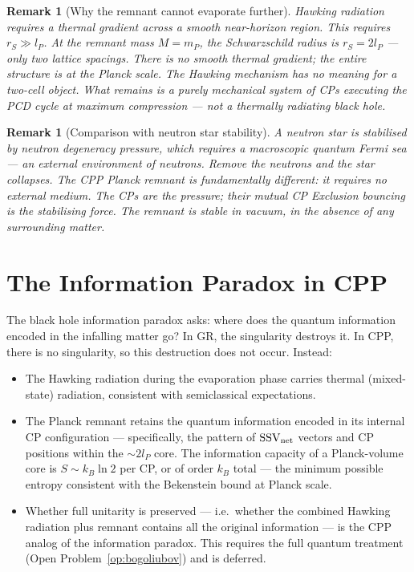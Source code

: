 \documentclass[12pt]{article}
\newtheorem{remark}[theorem]{Remark}
\newcommand{\lP}{l_P}
\newcommand{\mP}{m_P}
\newcommand{\rS}{r_S}
\newcommand{\SSV}{\mathrm{SSV}}
\begin{document}
\begin{remark}[Why the remnant cannot evaporate further]
Hawking radiation requires a thermal gradient across a smooth
near-horizon region.  This requires $\rS \gg \lP$.  At the remnant
mass $M = \mP$, the Schwarzschild radius is $\rS = 2\lP$ — only two
lattice spacings.  There is no smooth thermal gradient; the entire
structure is at the Planck scale.  The Hawking mechanism has no
meaning for a two-cell object.  What remains is a purely mechanical
system of CPs executing the PCD cycle at maximum compression —
not a thermally radiating black hole.
\end{remark}

\begin{remark}[Comparison with neutron star stability]
A neutron star is stabilised by neutron degeneracy pressure, which
requires a macroscopic quantum Fermi sea — an external environment of
neutrons.  Remove the neutrons and the star collapses.  The CPP Planck
remnant is fundamentally different: it requires no external medium.
The CPs \emph{are} the pressure; their mutual CP Exclusion bouncing
\emph{is} the stabilising force.  The remnant is stable in vacuum,
in the absence of any surrounding matter.
\end{remark}

\section{The Information Paradox in CPP}
\label{sec:information}

The black hole information paradox asks: where does the quantum
information encoded in the infalling matter go?  In GR, the singularity
destroys it.  In CPP, there is no singularity, so this destruction
does not occur.  Instead:

\begin{itemize}[noitemsep]
  \item The Hawking radiation during the evaporation phase carries
    thermal (mixed-state) radiation, consistent with semiclassical
    expectations.

  \item The Planck remnant retains the quantum information encoded in
    its internal CP configuration — specifically, the pattern of
    $\SSV_{\rm net}$ vectors and CP positions within the $\sim 2\lP$
    core.  The information capacity of a Planck-volume core is
    $S \sim k_B \ln 2$ per CP, or of order $k_B$ total — the
    minimum possible entropy consistent with the Bekenstein bound
    at Planck scale.

  \item Whether full unitarity is preserved — i.e.\ whether the
    combined Hawking radiation plus remnant contains all the
    original information — is the CPP analog of the information
    paradox.  This requires the full quantum treatment
    (Open Problem~\ref{op:bogoliubov}) and is deferred.
\end{itemize}
\end{document}
